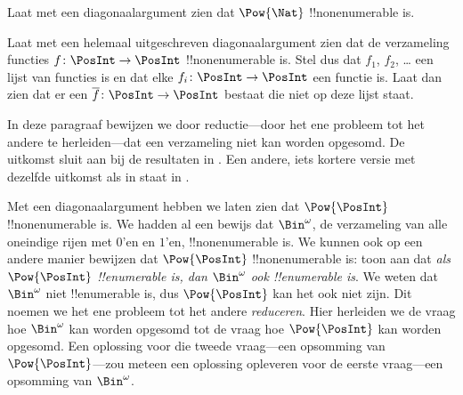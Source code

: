 \documentclass[openany]{memoir}
\begin{document}
\begin{prob}
Laat met een diagonaalargument zien dat $\Pow{\Nat}$
!!{nonenumerable} is.
\end{prob}

\begin{prob}\label{sfr:siz:nen:prob:f-posint}
Laat met een helemaal uitgeschreven diagonaalargument zien dat de
verzameling functies $f \colon \PosInt \to \PosInt$ !!{nonenumerable} is. Stel dus
dat $f_1$, $f_2$, \dots{} een lijst van functies is en dat elke
$f_i\colon \PosInt \to \PosInt$ een functie is. Laat dan zien dat er een
$\overline{f}\colon \PosInt \to \PosInt$ bestaat die niet op deze lijst
staat.
\end{prob}
\endgroup

\begingroup
\def\olfilename{OLP-0034}
\def\olfilepath{content/sets-functions-relations/size-of-sets/}
\hypertarget{unit-OLP-0034}{}





\begin{editorial}
  In deze paragraaf bewijzen we door reductie---door het ene probleem
  tot het andere te herleiden---dat een verzameling niet kan worden
  opgesomd. De uitkomst sluit aan bij de resultaten in
  . Een andere, iets kortere versie met dezelfde
  uitkomst als in  staat in .
\end{editorial}

Met een diagonaalargument hebben we laten zien dat $\Pow{\PosInt}$
!!{nonenumerable} is. We hadden al een bewijs dat $\Bin^\omega$, de
verzameling van alle oneindige rijen met $0$'en en $1$'en,
!!{nonenumerable} is. We kunnen ook op een andere manier bewijzen dat
$\Pow{\PosInt}$ !!{nonenumerable} is: toon aan dat \emph{als
$\Pow{\PosInt}$ !!{enumerable} is, dan $\Bin^\omega$ ook
!!{enumerable} is}. We weten dat $\Bin^\omega$ niet !!{enumerable} is,
dus $\Pow{\PosInt}$ kan het ook niet zijn. Dit noemen we het ene
probleem tot het andere \emph{reduceren}. Hier herleiden we de vraag
hoe $\Bin^\omega$ kan worden opgesomd tot de vraag hoe
$\Pow{\PosInt}$ kan worden opgesomd. Een oplossing voor die tweede
vraag---een opsomming van $\Pow{\PosInt}$---zou meteen een oplossing
opleveren voor de eerste vraag---een opsomming van $\Bin^\omega$.
\end{document}
